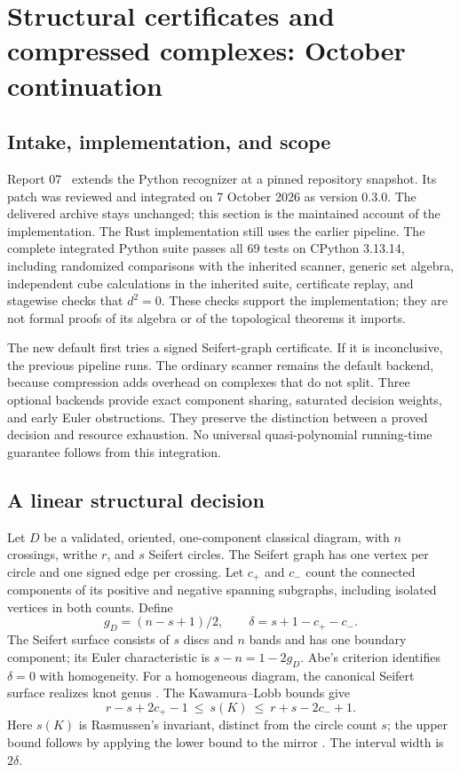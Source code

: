 \section{Structural certificates and compressed complexes: October continuation}
\label{sec:structural}

\subsection{Intake, implementation, and scope}
Report 07~\cite{structural07} extends the Python recognizer at a pinned
repository snapshot. Its patch was reviewed and integrated on 7 October 2026
as version 0.3.0. The delivered archive stays unchanged; this section is the
maintained account of the implementation. The Rust implementation still uses
the earlier pipeline. The complete integrated Python suite passes all 69
tests on CPython 3.13.14, including randomized comparisons with the inherited
scanner, generic set algebra, independent cube calculations in the inherited
suite, certificate replay, and stagewise checks that $d^2=0$.
These checks support the implementation; they are not formal proofs of its
algebra or of the topological theorems it imports.

The new default first tries a signed Seifert-graph certificate. If it is
inconclusive, the previous pipeline runs. The ordinary scanner remains the
default backend, because compression adds overhead on complexes that do not
split. Three optional backends provide exact component sharing, saturated
decision weights, and early Euler obstructions. They preserve the distinction
between a proved decision and resource exhaustion. No universal
quasi-polynomial running-time guarantee follows from this integration.

\subsection{A linear structural decision}
Let $D$ be a validated, oriented, one-component classical diagram, with $n$
crossings, writhe $r$, and $s$ Seifert circles. The Seifert graph has one
vertex per circle and one signed edge per crossing. Let $c_+$ and $c_-$ count
the connected components of its positive and negative spanning subgraphs,
including isolated vertices in both counts. Define
\[
 g_D=(n-s+1)/2,\qquad \delta=s+1-c_+-c_-.
\]
The Seifert surface consists of $s$ discs and $n$ bands and has one boundary
component; its Euler characteristic is $s-n=1-2g_D$.
Abe's criterion identifies $\delta=0$ with homogeneity. For a homogeneous
diagram, the canonical Seifert surface realizes knot genus
\cite[Theorems 2.3 and 3.4]{abe}. The Kawamura--Lobb bounds give
\[
 r-s+2c_+-1\ \le\ s(K)\ \le\ r+s-2c_-+1.
\]
Here $s(K)$ is Rasmussen's invariant, distinct from the circle count $s$;
the upper bound follows by applying the lower bound to the mirror
\cite{lobb,abe}. The interval width is $2\delta$.

